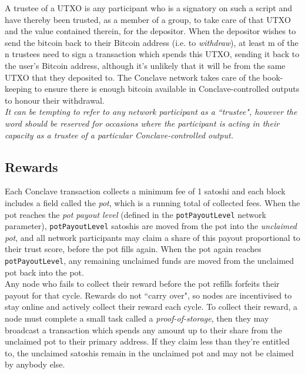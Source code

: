 \documentclass{report}
\begin{document}
			A trustee of a UTXO is any participant who is a signatory on such a script and have thereby been trusted, as a member of a group, to take care of that UTXO and the value contained therein, for the depositor. When the depositor wishes to send the bitcoin back to their Bitcoin address (i.e. to \textit{withdraw}), at least m of the n trustees need to sign a transaction which spends this UTXO, sending it back to the user's Bitcoin address, although it's unlikely that it will be from the same UTXO that they deposited to. The Conclave network takes care of the book-keeping to ensure there is enough bitcoin available in Conclave-controlled outputs to honour their withdrawal.\\
			
			\textit{It can be tempting to refer to any network participant as a ``trustee",  however the word should be reserved for occasions where the participant is acting in their capacity as a trustee of a particular Conclave-controlled output.}
		\subsection{Rewards}
		Each Conclave transaction collects a minimum fee of 1 satoshi and each block includes a field called the \textit{pot},  which is a running total of collected fees. When the pot reaches the \textit{pot payout level} (defined in the \texttt{potPayoutLevel} network parameter),  \texttt{potPayoutLevel} satoshis are moved from the pot into the \textit{unclaimed pot}, and all network participants may claim a share of this payout proportional to their trust score,  before the pot fills again. When the pot again reaches \texttt{potPayoutLevel}, any remaining unclaimed funds are moved from the unclaimed pot back into the pot. \\
		
		Any node who fails to collect their reward before the pot refills forfeits their payout for that cycle. Rewards  do not ``carry over", so nodes are incentivised to stay online and actively collect their reward each cycle. To collect their reward, a node must complete a small task called a \textit{proof-of-storage}, then they may broadcast a transaction which spends any amount up to their share from the unclaimed pot to their primary address. If they claim less than they're entitled to, the unclaimed satoshis remain in the unclaimed pot and may not be claimed by anybody else. \\
		
\end{document}

